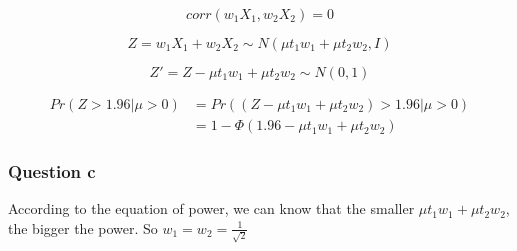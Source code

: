 \documentclass[]{article}
\begin{document}
\[corr(w_1X_1,w_2X_2)=0\]

\[Z = w_1X_1+w_2X_2 \sim N(\mu t_1w_1+\mu t_2w_2,I)\]

\[Z'=Z-\mu t_1w_1+\mu t_2w_2 \sim N(0,1)\]

\[\begin{split}
Pr(Z>1.96|\mu>0) &= Pr((Z-\mu t_1w_1+\mu t_2w_2)>1.96|\mu>0) \\
&= 1-\Phi(1.96-\mu t_1w_1+\mu t_2w_2)
\end{split}\]

\hypertarget{question-c-2}{%
\subsubsection{Question c}\label{question-c-2}}

According to the equation of power, we can know that the smaller
\(\mu t_1w_1+\mu t_2w_2\), the bigger the power. So
\(w_1=w_2=\frac{1}{\sqrt 2}\)
\end{document}
